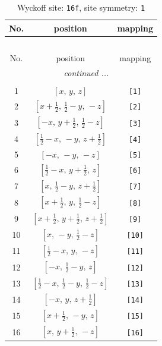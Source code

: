 \documentclass[fleqn,8pt]{jsarticle}
\begin{document}
\begin{longtable}{ccc}
\caption{Wyckoff site: {\tt 16f}, site symmetry: {\tt 1}}
 \\
 \hline \hline
No. & position & mapping \\ \hline \endfirsthead

\multicolumn{2}{l}{\tablename\ \thetable{}} \\
 \hline \hline
No. & position & mapping \\ \hline \endhead

 \hline \hline
\multicolumn{2}{r}{\footnotesize\it continued ...} \\ \endfoot

 \hline \hline
\multicolumn{2}{r}{} \\ \endlastfoot

1 & $\left[ x,\, y,\, z \right]$ & {\tt [1]} \\ \hline
2 & $\left[ x + \frac{1}{2},\, \frac{1}{2} - y,\, - z \right]$ & {\tt [2]} \\ \hline
3 & $\left[ - x,\, y + \frac{1}{2},\, \frac{1}{2} - z \right]$ & {\tt [3]} \\ \hline
4 & $\left[ \frac{1}{2} - x,\, - y,\, z + \frac{1}{2} \right]$ & {\tt [4]} \\ \hline
5 & $\left[ - x,\, - y,\, - z \right]$ & {\tt [5]} \\ \hline
6 & $\left[ \frac{1}{2} - x,\, y + \frac{1}{2},\, z \right]$ & {\tt [6]} \\ \hline
7 & $\left[ x,\, \frac{1}{2} - y,\, z + \frac{1}{2} \right]$ & {\tt [7]} \\ \hline
8 & $\left[ x + \frac{1}{2},\, y,\, \frac{1}{2} - z \right]$ & {\tt [8]} \\ \hline
9 & $\left[ x + \frac{1}{2},\, y + \frac{1}{2},\, z + \frac{1}{2} \right]$ & {\tt [9]} \\ \hline
10 & $\left[ x,\, - y,\, \frac{1}{2} - z \right]$ & {\tt [10]} \\ \hline
11 & $\left[ \frac{1}{2} - x,\, y,\, - z \right]$ & {\tt [11]} \\ \hline
12 & $\left[ - x,\, \frac{1}{2} - y,\, z \right]$ & {\tt [12]} \\ \hline
13 & $\left[ \frac{1}{2} - x,\, \frac{1}{2} - y,\, \frac{1}{2} - z \right]$ & {\tt [13]} \\ \hline
14 & $\left[ - x,\, y,\, z + \frac{1}{2} \right]$ & {\tt [14]} \\ \hline
15 & $\left[ x + \frac{1}{2},\, - y,\, z \right]$ & {\tt [15]} \\ \hline
16 & $\left[ x,\, y + \frac{1}{2},\, - z \right]$ & {\tt [16]} \\
\end{longtable}
\end{document}
